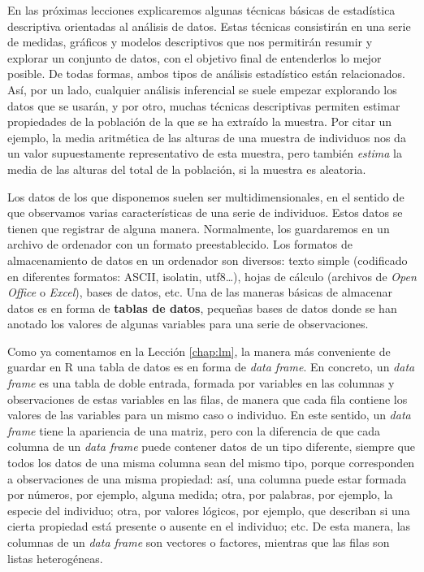 \documentclass[]{book}
\theoremstyle{definition}
\theoremstyle{definition}
\theoremstyle{definition}
\theoremstyle{remark}
\begin{document}
En las próximas lecciones explicaremos algunas técnicas básicas de estadística descriptiva orientadas al análisis de datos. Estas técnicas consistirán en una serie de medidas, gráficos y modelos descriptivos que nos permitirán resumir y explorar un conjunto de datos, con el objetivo final de entenderlos lo mejor posible. De todas formas, ambos tipos de análisis estadístico están relacionados. Así, por un lado, cualquier análisis inferencial se suele empezar explorando los datos que se usarán, y por otro, muchas técnicas descriptivas permiten estimar propiedades de la población de la que se ha extraído la muestra. Por citar un ejemplo, la media aritmética de las alturas de una muestra de individuos nos da un valor supuestamente representativo de esta muestra, pero también \emph{estima} la media de las alturas del total de la población, si la muestra es aleatoria.

Los datos de los que disponemos suelen ser multidimensionales, en el sentido de que
observamos varias características de una serie de individuos. Estos datos
se tienen que registrar de alguna manera. Normalmente, los
guardaremos en un archivo de ordenador con un formato preestablecido.
Los formatos de almacenamiento de datos en un ordenador son diversos: texto
simple (codificado en diferentes formatos: ASCII, isolatin, utf8\ldots{}), hojas
de cálculo (archivos de \emph{Open Office} o \emph{Excel}), bases de datos, etc.
Una de las maneras básicas de almacenar datos es en forma de \textbf{tablas
de datos}, pequeñas bases de datos donde se han anotado los valores de algunas variables para una serie de observaciones.

Como ya comentamos en la Lección \ref{chap:lm}, la manera más conveniente de guardar en R una tabla de datos es en forma de \emph{data frame}. En concreto, un \emph{data frame} es una tabla de doble entrada, formada por variables en las columnas y observaciones de estas variables en las filas, de manera que cada fila contiene los valores de las variables para un mismo caso o individuo. En este sentido, un \emph{data frame} tiene la apariencia de una matriz, pero con la diferencia de que cada columna de un \emph{data frame} puede contener datos de un tipo diferente, siempre que todos los datos de una misma columna sean del mismo tipo, porque corresponden a observaciones
de una misma propiedad: así, una columna puede estar formada por números, por ejemplo, alguna medida; otra, por palabras, por ejemplo, la especie del individuo; otra, por valores lógicos, por ejemplo, que describan si una cierta propiedad está presente o ausente en el individuo; etc. De esta manera, las columnas de un \emph{data frame} son vectores o factores, mientras que las filas son listas heterogéneas.
\end{document}
